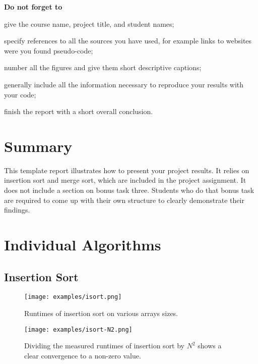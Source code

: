 \documentclass[a4paper,10pt]{article}
\begin{document}
{\vfill

\noindent
\bfseries
Do not forget to
\begin{compactitem}
\item
  give the course name, project title, and student names;
\item
  specify references to all the sources you have used, for example links to websites were you found pseudo-code;
\item
  number all the figures and give them short descriptive captions;
\item
  generally include all the information necessary to reproduce your results with your code;
\item
  finish the report with a short overall conclusion.
\end{compactitem}

}
\newpage


\section*{Summary}

This template report illustrates how to present your project results.
It relies on insertion sort and merge sort, which are included in the project assignment.
It does not include a section on bonus task three.
Students who do that bonus task are required to come up with their own structure to clearly demonstrate their findings.



\section*{Individual Algorithms}



\subsection*{Insertion Sort}

\begin{figure}
  \centering
  \texttt{[image: examples/isort.png]}
  \caption{
    Runtimes of insertion sort on various arrays sizes.
  }\label{fig:isort}
  \vspace{\baselineskip}
  \texttt{[image: examples/isort-N2.png]}
  \caption{
    Dividing the measured runtimes of insertion sort by $N^2$ shows a clear convergence to a non-zero value.
  }\label{fig:isort-N2}
\end{figure}
\end{document}
